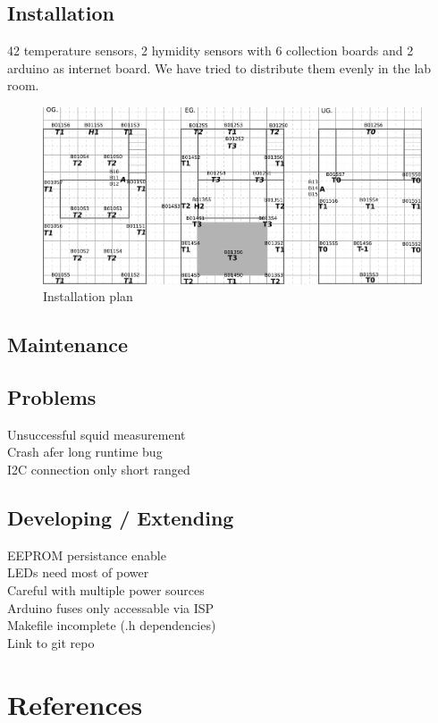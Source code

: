 \documentclass[a4paper]{scrreprt}
\begin{document}
\section{Installation}
42 temperature sensors, 2 hymidity sensors with 6 collection boards and 2 arduino as internet board. We have tried to distribute them evenly in the lab room.
\begin{figure}
	\centering
	\includegraphics[width=\textwidth]{img/installPlan.pdf}
  \caption{Installation plan}
	\label{fig:install}
\end{figure}
\section{Maintenance}
\section{Problems}
Unsuccessful squid measurement\\
Crash afer long runtime bug\\
I2C connection only short ranged
\section{Developing / Extending}
EEPROM persistance enable\\
LEDs need most of power\\
Careful with multiple power sources\\
Arduino fuses only accessable via ISP\\
Makefile incomplete (.h dependencies)\\
Link to git repo
\chapter{References}
%

\begingroup
\def\chapter*#1{}

\endgroup
%
\nocite{*}
\end{document}
